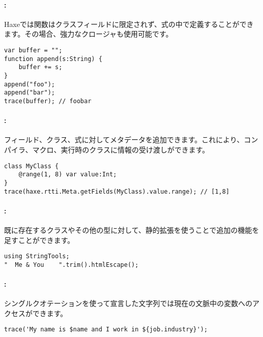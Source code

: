 \paragraph{:}

Haxeでは関数はクラスフィールドに限定されず、式の中で定義することができます。その場合、強力なクロージャも使用可能です。

\begin{lstlisting}
var buffer = "";
function append(s:String) {
    buffer += s;
}
append("foo");
append("bar");
trace(buffer); // foobar
\end{lstlisting}

\paragraph{:}

フィールド、クラス、式に対してメタデータを追加できます。これにより、コンパイラ、マクロ、実行時のクラスに情報の受け渡しができます。

\begin{lstlisting}
class MyClass {
    @range(1, 8) var value:Int;
}
trace(haxe.rtti.Meta.getFields(MyClass).value.range); // [1,8]
\end{lstlisting}

\paragraph{:}

既に存在するクラスやその他の型に対して、静的拡張を使うことで追加の機能を足すことができます。

\begin{lstlisting}
using StringTools;
"  Me & You    ".trim().htmlEscape();
\end{lstlisting}

\paragraph{:}

シングルクオテーションを使って宣言した文字列では現在の文脈中の変数へのアクセスができます。

\begin{lstlisting}
trace('My name is $name and I work in ${job.industry}');
\end{lstlisting}

